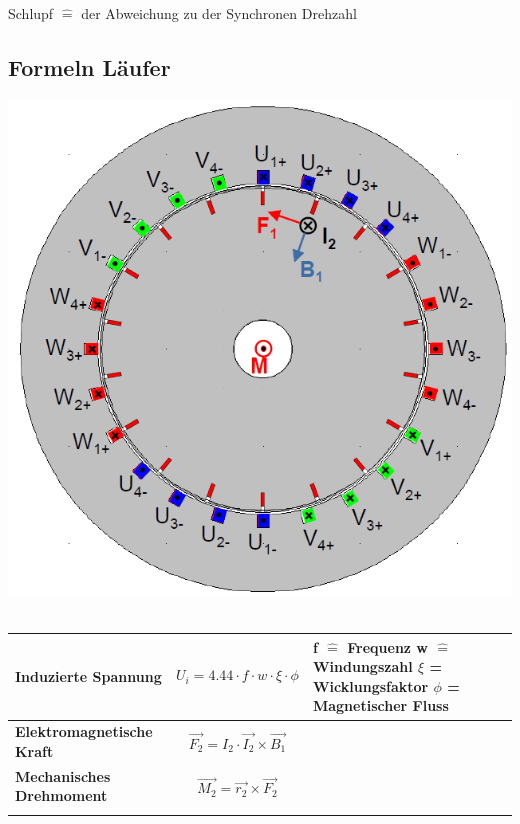 Schlupf $\widehat{=}$ der Abweichung zu der Synchronen Drehzahl 
\clearpage
\pagebreak
\subsection{Formeln Läufer}
\includegraphics[scale = 0.5]{images/QuerschnittAmotor}\\\\
\begin{tabular}[b]{|C{4cm}| P{8cm} | P{5cm}|}
	\hline
	\textbf{Induzierte Spannung} & \begin{equation*}
	U_i = 4.44\cdot f\cdot w\cdot\xi\cdot\phi
	\end{equation*} & f $\widehat{=}$ Frequenz \newline w $\widehat{=}$ Windungszahl \newline $\xi$ = Wicklungsfaktor \newline $\phi$ = Magnetischer Fluss \\
	\hline
\textbf{Elektromagnetische Kraft}	& \begin{equation*} \vec{F_2} = I_2\cdot\vec{I_2}\times\vec{B_1}
\end{equation*} & \\
	\hline
\textbf{Mechanisches Drehmoment}	& \begin{equation*}
	\vec{M_2} = \vec{r_2}\times\vec{F_2}
\end{equation*} & \\
	\hline
	& & \\
	\hline
\end{tabular}
\clearpage
